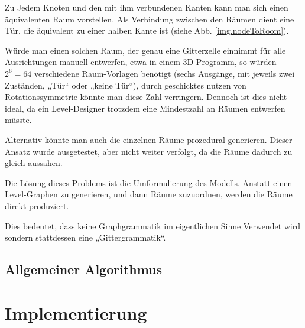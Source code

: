 
Zu Jedem Knoten und den mit ihm verbundenen Kanten kann man sich einen äquivalenten Raum vorstellen. Als Verbindung zwischen den Räumen dient eine Tür, die äquivalent zu einer halben Kante ist (siehe Abb. \ref{img.nodeToRoom}).


Würde man einen solchen Raum, der genau eine Gitterzelle einnimmt für alle Ausrichtungen manuell entwerfen, etwa in einem 3D-Programm, so würden $ 2^6 = 64 $ verschiedene Raum-Vorlagen benötigt (sechs Ausgänge, mit jeweils zwei Zuständen, „Tür“ oder „keine Tür“), durch geschicktes nutzen von Rotationssymmetrie könnte man diese Zahl verringern. Dennoch ist dies nicht ideal, da ein Level-Designer trotzdem eine Mindestzahl an Räumen entwerfen müsste. 


Alternativ könnte man auch die einzelnen Räume prozedural generieren. Dieser Ansatz wurde ausgetestet, aber nicht weiter verfolgt, da die Räume dadurch zu gleich aussahen. 

Die Lösung dieses Problems ist die Umformulierung des Modells. Anstatt einen Level-Graphen zu generieren, und dann Räume zuzuordnen, werden die Räume direkt produziert. 

Dies bedeutet, dass keine Graphgrammatik im eigentlichen Sinne Verwendet wird sondern stattdessen eine „Gittergrammatik“. 






\section{Allgemeiner Algorithmus}\label{s.allgemeinerAlgorithmus}

\chapter{Implementierung}\label{c.implementierung}


